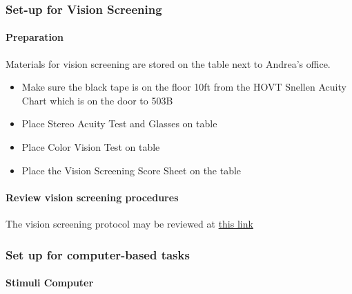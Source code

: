 \documentclass[]{article}
\providecommand{\tightlist}{%
  \setlength{\itemsep}{0pt}\setlength{\parskip}{0pt}}
\let\oldparagraph\paragraph
\renewcommand{\paragraph}[1]{\oldparagraph{#1}\mbox{}}
\begin{document}
\subsubsection{Set-up for Vision
Screening}\label{set-up-for-vision-screening}

\paragraph{Preparation}\label{preparation}

Materials for vision screening are stored on the table next to Andrea's
office.

\begin{itemize}
\tightlist
\item
  Make sure the black tape is on the floor 10ft from the HOVT Snellen
  Acuity Chart which is on the door to 503B
\item
  Place Stereo Acuity Test and Glasses on table
\item
  Place Color Vision Test on table
\item
  Place the Vision Screening Score Sheet on the table
\end{itemize}

\paragraph{Review vision screening
procedures}\label{review-vision-screening-procedures}

The vision screening protocol may be reviewed at
\href{vision-screening-protocol.html}{this link}

\subsubsection{Set up for computer-based
tasks}\label{set-up-for-computer-based-tasks}

\paragraph{Stimuli Computer}\label{stimuli-computer}
\end{document}
